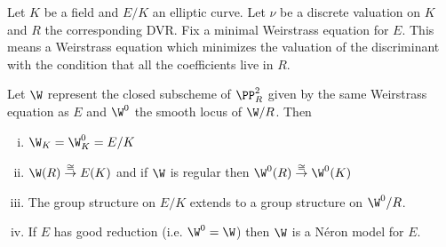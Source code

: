 \documentclass[11pt]{article}
\newcommand{\neron}{N\'{e}ron }
\begin{document}
\begin{thm}\label{weirstrassneronmodel}
	Let $K$ be a field and $E/K$ an elliptic curve. Let $\nu$ be a discrete valuation on $K$ and $R$ the corresponding DVR. Fix a minimal Weirstrass equation for $E$. This means a Weirstrass equation which minimizes the valuation of the discriminant with the condition that all the coefficients live in $R$.

	Let $\W$ represent the closed subscheme of $\PP^2_R$ given by the same Weirstrass equation as $E$ and $\W^0$ the smooth locus of $\W/R$. Then
	\begin{enumerate}[(i)]
		\item $\W_K = \W^0_K = E/K$
		\item $\W(R) \overset{\cong}{\to} E(K)$ and if $\W$ is regular then $\W^0(R) \overset{\cong}{\to} \W^0(K)$
		\item The group structure on $E/K$ extends to a group structure on $\W^0/R$.
		\item If $E$ has good reduction (i.e. $\W^0 = \W$) then $\W$ is a \neron model for $E$.
	\end{enumerate}
\end{thm}
\end{document}
